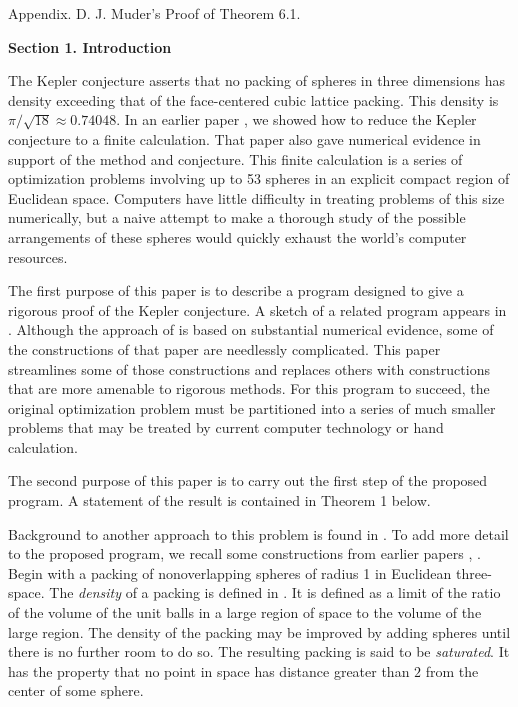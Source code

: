 Appendix. D. J. Muder's Proof of Theorem 6.1.
 

\bigskip
\centerline{\bf Section 1. Introduction}
\bigskip

The Kepler conjecture
asserts that no packing of
spheres in three dimensions has density exceeding that of the
face-centered cubic lattice packing. This density is 
$\pi/\sqrt{18}\approx 0.74048$.
  In an earlier paper \cite{H2}, we showed how to
reduce the Kep\-ler conjecture to a finite calculation.
That paper also gave numerical evidence in support
of the method and conjecture.
This finite calculation is a series of optimization problems
involving up to 53 spheres in an explicit compact region of
Euclidean space.
Computers have little difficulty in treating problems of this size
numerically, but a naive attempt to make a thorough study
of the possible arrangements of these spheres would quickly
exhaust the world's computer resources.

The first purpose of this paper is to describe a
program designed to give a rigorous proof of the Kepler conjecture.
A sketch of a related program appears in \cite{H2}.  Although
the approach of \cite{H2} is based on substantial
numerical evidence,
some of the constructions of that paper are needlessly complicated.
This paper streamlines some of those constructions and
replaces others with constructions that are more amenable
to rigorous methods.
For this program to succeed, the
original optimization problem must be partitioned into a series
of much smaller problems that may be treated by current computer
technology or hand calculation.

The second purpose of this paper is to carry out the first step of
the proposed program.  A statement of the result is
contained in Theorem 1 below.  

Background to another approach to this problem is found in 
\cite{H3}.
To add more detail to the proposed program, 
we recall some constructions from earlier papers \cite{H1}, \cite{H2}.
Begin with
a packing of nonoverlapping spheres of radius 1 in Euclidean three-space.
The {\it density} of a packing is defined in \cite{H1}.  It is defined
as a limit of the ratio of the
volume of the unit balls in a large region of space
to the volume of the large region.
The density of the packing may be improved by adding spheres until
there is no further room to do so.  The resulting packing is said to
be {\it saturated\/}.  It has the property that no point in space has
distance greater than $2$ from the center of some sphere.

